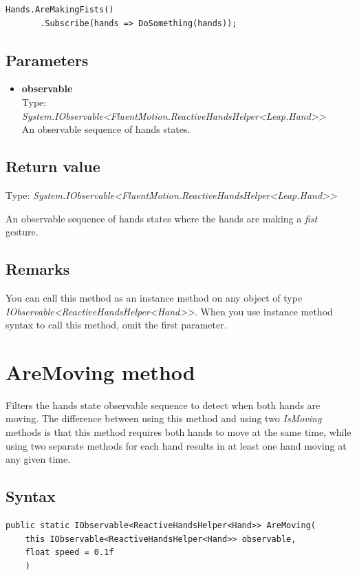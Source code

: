 \documentclass[12pt,a4paper,twoside]{report}
\begin{document}
\begin{lstlisting}[caption=Usage example]
  Hands.AreMakingFists()
       .Subscribe(hands => DoSomething(hands));
\end{lstlisting}

\subsection{Parameters}
\begin{itemize}
  \item \textbf{observable}\\
    Type: \textit{System.IObservable<FluentMotion.ReactiveHandsHelper<Leap.Hand>{}>}\\
    An observable sequence of hands states.
\end{itemize}

\subsection{Return value}
Type: \textit{System.IObservable<FluentMotion.ReactiveHandsHelper<Leap.Hand>{}>}

An observable sequence of hands states where the hands are making a \textit{fist} gesture.

\subsection{Remarks}
You can call this method as an instance method on any object of type \textit{IObservable<ReactiveHandsHelper<Hand>{}>}. When you use instance method syntax to call this method, omit the first parameter.

\newpage

\section{AreMoving method}
Filters the hands state observable sequence to detect when both hands are moving. The difference between using this method and using two \textit{IsMoving} methods is that this method requires both hands to move at the same time, while using two separate methods for each hand results in at least one hand moving at any given time.

\subsection{Syntax}
\begin{lstlisting}[caption=Declaration]
  public static IObservable<ReactiveHandsHelper<Hand>> AreMoving(
    this IObservable<ReactiveHandsHelper<Hand>> observable,
    float speed = 0.1f
    )
\end{lstlisting}
\end{document}
